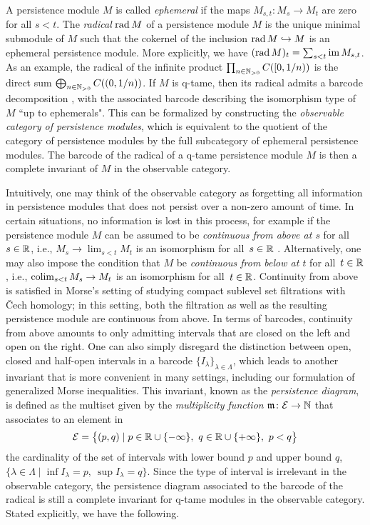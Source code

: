 A persistence module $M$ is called \emph{ephemeral} if the maps $M_{s,t} \colon M_s \to M_t$ are zero for all $s < t$.
The \emph{radical} $\operatorname{rad} M$ of a persistence module $M$ is the unique minimal submodule of $M$ such that the cokernel of the inclusion $\operatorname{rad} M \hookrightarrow M$ is an ephemeral persistence module.
More explicitly, we have $(\operatorname{rad} M)_t = \sum_{s<t}\operatorname{im} M_{s,t}$.
As an example, the radical of the infinite product $\prod_{n \in \mathbb{N}_{> 0}} C([0,1/n))$ is the direct sum $\bigoplus_{n \in \mathbb{N}_{> 0}} C((0,1/n))$.
If $M$ is q-tame, then its radical admits a barcode decomposition \cite[Corollary~3.6]{Chazal.2016b},
with the associated barcode describing the isomorphism type of~$M$ ``up to ephemerals".
This can be formalized by constructing the \emph{observable category of persistence modules}, which is equivalent to the quotient of the category of persistence modules by the full subcategory of ephemeral persistence modules.
The barcode of the radical of a q-tame persistence module $M$ is then a complete invariant of $M$ in the observable category.

Intuitively, one may think of the observable category as forgetting all information in persistence modules that does not persist over a non-zero amount of time.
In certain situations, no information is lost in this process, for example if the persistence module $M$ can be assumed to be \emph{continuous from above at $s$} for all~$s \in \mathbb{R}$, i.e., $M_{s} \to \lim_{s < t} M_{t}$ is an isomorphism for all~$s \in \mathbb{R}$ \cite{Schmahl.2021}.
Alternatively, one may also impose the condition that $M$ be \emph{continuous from below at $t$} for all~$t \in \mathbb{R}$, i.e., $\operatorname*{colim}_{s < t} M_{s} \to M_{t}$ is an isomorphism for all~$t \in \mathbb{R}$.
Continuity from above is satisfied in Morse's setting of studying compact sublevel set filtrations with \v{C}ech homology; in this setting, both the filtration as well as the resulting persistence module are continuous from above.
In terms of barcodes, continuity from above amounts to only admitting intervals that are closed on the left and open on the right.
One can also simply disregard the distinction between open, closed and half-open intervals in a barcode $\{I_{\lambda}\}_{\lambda \in \Lambda}$, which leads to another invariant that is more convenient in many settings, including our formulation of generalized Morse inequalities.
This invariant, known as the \emph{persistence diagram}, is defined as the multiset given by the \emph{multiplicity function} $\mathfrak{m} \colon \mathcal{E} \to \mathbb{N}$ that associates to an element in
\begin{equation*}
\mathcal{E} =
\big\{ (p,q) \mid p \in \mathbb{R} \cup \{-\infty\}, \ q \in \mathbb{R} \cup \{+\infty\}, \ p < q \big\}
\end{equation*}
the cardinality of the set of intervals with lower bound $p$ and upper bound $q$, $\{ \lambda \in \Lambda \mid \inf I_{\lambda} = p,\ \sup I_{\lambda} = q\}$.
Since the type of interval is irrelevant in the observable category, the persistence diagram associated to the barcode of the radical is still a complete invariant for q-tame modules in the observable category.
Stated explicitly, we have the following.


